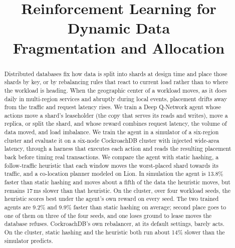 \documentclass[conference]{IEEEtran}
\begin{document}
\title{Reinforcement Learning for Dynamic Data\\
Fragmentation and Allocation}

\newif\ifanonymous
\anonymousfalse
\ifanonymous
\author{\IEEEauthorblockN{Anonymous Author(s)}
\IEEEauthorblockA{\textit{Submitted for double-blind review}}}
\else
\author{
}
\fi

\maketitle

\begin{abstract}
Distributed databases fix how data is split into shards at design time and
place those shards by key, or by rebalancing rules that react to current load
rather than to where the workload is heading. When the geographic center of a workload moves, as it does daily in
multi-region services and abruptly during local events, placement drifts away
from the traffic and request latency rises. We train a Deep Q-Network
agent whose actions move a shard's leaseholder (the copy that serves its reads and writes), move a replica, or split the shard, and whose reward combines
request latency, the volume of data moved, and load imbalance. We train the agent in a simulator
of a six-region cluster and evaluate it on a six-node CockroachDB cluster with
injected wide-area latency, through a harness that executes each action and reads the resulting placement back before timing real transactions. We compare the agent with static hashing, a follow-traffic heuristic that each window moves the worst-placed shard towards its traffic, and a co-location planner modeled on Lion. In simulation the agent is 13.8\% faster
than static hashing and moves about a fifth of the data the heuristic moves,
but remains 17\,ms slower than that heuristic. On the cluster, over four
workload seeds, the heuristic scores best under the agent's own reward on every seed. The two trained
agents are 9.2\% and 9.9\% faster than static hashing on average; second place goes to one of them on three of the
four seeds, and one loses ground to lease moves the database
refuses. CockroachDB's own rebalancer, at its default settings, barely acts. On the cluster, static hashing and the
heuristic both run about 14\% slower than the simulator predicts.
\end{abstract}
\end{document}
